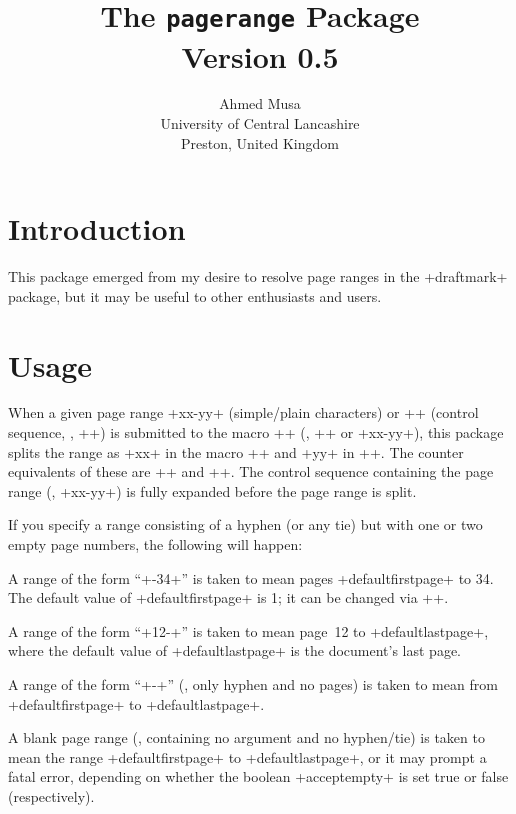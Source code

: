 \documentclass[10pt,a4paper]{article}
\begin{document}
\label{page:first}

\MakeShortVerb{\+}
\title{\textbf{The {\tt pagerange} Package}\\[1ex] Version 0.5}
\author{Ahmed Musa\\[.5ex]University of Central Lancashire\\
  Preston, United Kingdom\\[1ex]
}
\maketitle

\section{Introduction}
This package emerged from my desire to resolve page ranges in the +draftmark+ package, but it may be useful to other \texorlatex enthusiasts and users.

\section{Usage}

When a given page range +xx-yy+ (simple/plain characters) or +\pages+ (control sequence, \eg, +\def\pages{xx-yy}+) is submitted to the macro +\pagerange+ (\eg, ++ or +\pagerange\pages+), this package splits the range as +xx+ in the macro +\pagestart+ and +yy+ in +\pageend+. The counter equivalents of these are +\prg@cnta+ and +\prg@cntb+. The control sequence containing the page range (\eg, +\pages+) is fully expanded before the page range is split.

If you specify a range consisting of a hyphen (or any tie) but with one or two empty page numbers, the following will happen:
\begin{compactenum}[a)]
\item A range of the form ``+-34+'' is taken to mean pages +defaultfirstpage+ to 34. The default value of +defaultfirstpage+ is 1; it can be changed via +\pagerangeoptions+.
\item A range of the form ``+12-+'' is taken to mean page~12 to +defaultlastpage+, where the default value of +defaultlastpage+ is the document's last page.
\item A range of the form ``+-+'' (\ie, only hyphen and no pages) is taken to mean from +defaultfirstpage+ to +defaultlastpage+.
\item A blank page range (\ie, containing no argument and no hyphen/tie) is taken to mean the range +defaultfirstpage+ to +defaultlastpage+, or it may prompt a fatal error, depending on whether the boolean +acceptempty+ is set true or false (respectively).
\end{compactenum}
\end{document}
